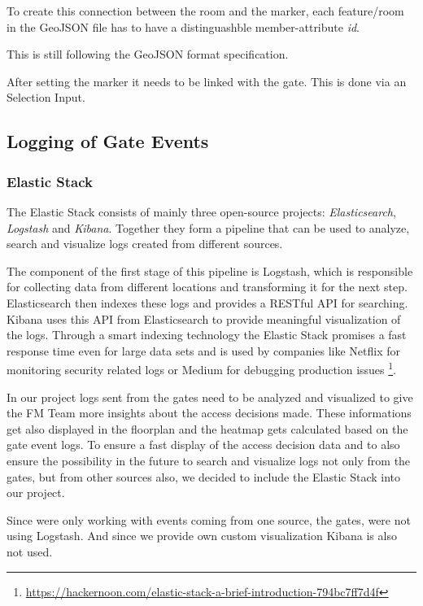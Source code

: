 To create this connection between the room and the marker, each feature/room in the GeoJSON file has to have a distinguashble member-attribute \emph{id}.

This is still following the GeoJSON format specification.

After setting the marker it needs to be linked with the gate. This is done via an Selection Input.



\subsection{Logging of Gate Events}
\label{Logging of Gate Events}

\subsubsection{Elastic Stack}
\label{Elastic Stack}

The Elastic Stack consists of mainly three open-source projects: \emph{Elasticsearch}, \emph{Logstash} and \emph{Kibana}.
Together they form a pipeline that can be used to analyze, search and visualize logs created from different sources. 

The component of the first stage of this pipeline is Logstash, which is responsible for collecting data from different locations and transforming it for the next step. Elasticsearch then indexes these logs and provides a RESTful API for searching. Kibana uses this API from Elasticsearch to provide meaningful visualization of the logs.
Through a smart indexing technology the Elastic Stack promises a fast response time even for large data sets and is used by companies like Netflix for monitoring security related logs or Medium for debugging production issues \footnote{\url{https://hackernoon.com/elastic-stack-a-brief-introduction-794bc7ff7d4f}}.

In our project logs sent from the gates need to be analyzed and visualized to give the FM Team more insights about the access decisions made. These informations get also displayed in the floorplan and the heatmap gets calculated based on the gate event logs. To ensure a fast display of the access decision data and to also ensure the possibility in the future to search and visualize logs not only from the gates, but from other sources also, we decided to include the Elastic Stack into our project.

Since were only working with events coming from one source, the gates, were not using Logstash. And since we provide own custom visualization Kibana is also not used.


